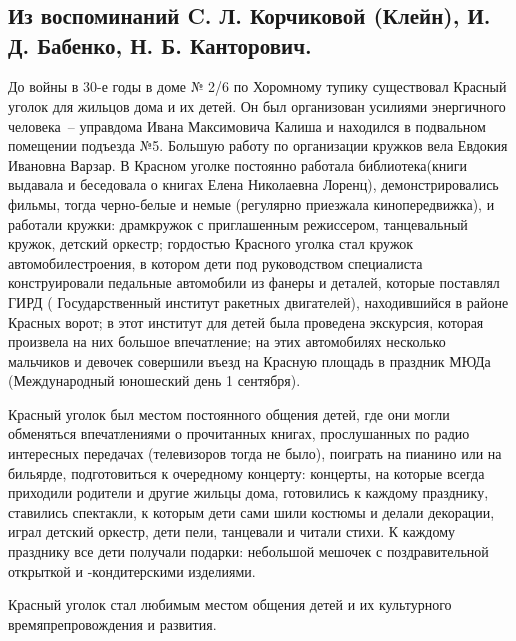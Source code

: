 \chapter{}

\section*{Из воспоминаний C. Л. Корчиковой (Клейн), И. Д. Бабенко, Н. Б. Канторович.}

До войны в 30-е годы в доме № 2/6 по Хоромному тупику существовал Красный уголок для жильцов дома и их детей. Он был организован усилиями энергичного человека~-- управдома Ивана Максимовича Калиша и находился в подвальном помещении подъезда №5. Большую работу по организации кружков вела Евдокия Ивановна Варзар. В Красном уголке постоянно работала библиотека(книги выдавала и беседовала о книгах Елена Николаевна Лоренц), демонстрировались фильмы, тогда черно-белые и немые (регулярно приезжала кинопередвижка), и работали кружки: драмкружок с приглашенным режиссером,   танцевальный   кружок, детский   оркестр; гордостью    Красного уголка стал    кружок автомобилестроения,   в   котором дети под руководством специалиста конструировали     педальные   автомобили   из   фанеры и деталей, которые поставлял ГИРД ( Государственный   институт ракетных двигателей), находившийся в   районе   Красных   ворот;   в этот институт для детей   была проведена  экскурсия,    которая  произвела на  них    большое   впечатление; на этих автомобилях несколько мальчиков и   девочек совершили   въезд  на Красную площадь    в   праздник МЮДа   (Международный   юношеский день 1 сентября).

Красный уголок был местом постоянного общения  детей, где они могли обменяться впечатлениями о прочитанных книгах,    прослушанных   по   радио интересных передачах (телевизоров тогда не было), поиграть на пианино или на бильярде, подготовиться      к очередному концерту: концерты,   на   которые всегда приходили   родители и   другие жильцы дома, готовились    к каждому празднику, ставились спектакли, к которым дети сами шили костюмы и делали декорации,   играл   детский оркестр,   дети     пели, танцевали и читали стихи. К каждому празднику все   дети получали подарки:   небольшой   мешочек   с поздравительной открыткой и -кондитерскими изделиями.

\vfill

Красный уголок стал любимым местом общения детей и их культурного времяпрепровождения и развития.

